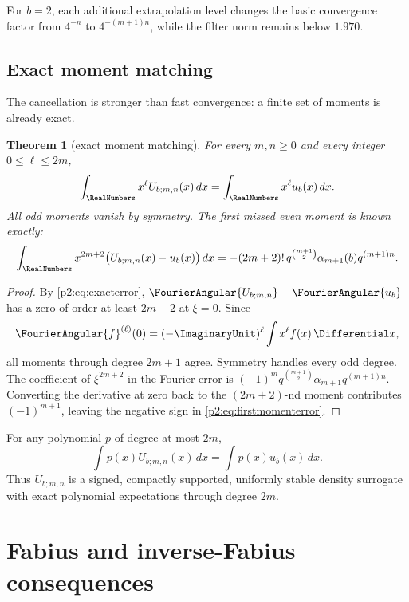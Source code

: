 \documentclass[11pt,oneside]{article}
\numberwithin{equation}{section}
\newtheorem{theorem}{Theorem}[section]
\theoremstyle{definition}
\theoremstyle{remark}
\begin{document}
For \(b=2\), each additional extrapolation level changes the basic convergence
factor from \(4^{-n}\) to \(4^{-(m+1)n}\), while the filter norm remains below
\(1.970\).

\subsection{Exact moment matching}

The cancellation is stronger than fast convergence: a finite set of moments is
already exact.

\begin{theorem}[exact moment matching]
\label{p2:thm:moments}
For every \(m,n\geq0\) and every integer \(0\leq\ell\leq2m\),
\begin{equation}
 \int_{\RealNumbers}x^\ell U_{b;m,n}(x)\,dx
 =\int_{\RealNumbers}x^\ell u_b(x)\,dx.
 \label{p2:eq:momentmatch}
\end{equation}
All odd moments vanish by symmetry. The first missed even moment is known
exactly:
\begin{equation}
 \int_{\RealNumbers}x^{2m+2}\bigl(U_{b;m,n}(x)-u_b(x)\bigr)\,dx
 =-(2m+2)!\,q^{\binom{m+1}{2}}
 \alpha_{m+1}(b)q^{(m+1)n}.
 \label{p2:eq:firstmomenterror}
\end{equation}
\end{theorem}

\begin{proof}
By \eqref{p2:eq:exacterror},
\(\FourierAngular{U_{b;m,n}}-\FourierAngular{u_b}\) has a zero of order at least \(2m+2\) at
\(\xi=0\). Since
\[
 \FourierAngular{f}^{(\ell)}(0)=(-\ImaginaryUnit)^\ell\int x^\ell f(x)\,\Differential x,
\]
all moments through degree \(2m+1\) agree. Symmetry handles every odd degree.
The coefficient of \(\xi^{2m+2}\) in the Fourier error is
\((-1)^mq^{\binom{m+1}{2}}\alpha_{m+1}q^{(m+1)n}\). Converting the derivative
at zero back to the \((2m+2)\)-nd moment contributes \((-1)^{m+1}\), leaving the
negative sign in \eqref{p2:eq:firstmomenterror}.
\end{proof}

\begin{remark}
For any polynomial \(p\) of degree at most \(2m\),
\[
 \int p(x)U_{b;m,n}(x)\,dx=\int p(x)u_b(x)\,dx.
\]
Thus \(U_{b;m,n}\) is a signed, compactly supported, uniformly stable density
surrogate with exact polynomial expectations through degree \(2m\).
\end{remark}

\section{Fabius and inverse-Fabius consequences}
\label{p2:sec:fabius}
\end{document}
